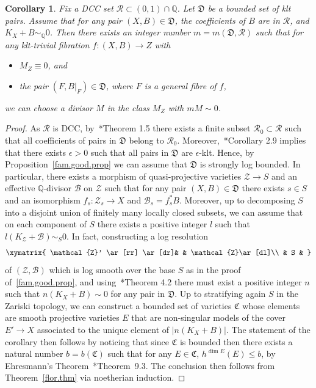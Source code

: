 \documentclass[11pt]{ip-journal}
\newtheorem{corollary}[theorem]{Corollary}
\theoremstyle{definition}
\newcommand{\bQ}{\mathbb{Q}}
\begin{document}
\begin{corollary}
\label{cbf.triv.cor}
Fix a DCC set 
$\mathcal{R} \subset (0, 1) \cap \bQ$. 
Let 
$\mathfrak{D}$ 
be a bounded set of klt pairs.
Assume that for any pair 
$(X, B) \in \mathfrak{D}$, 
the coefficients of 
$B$ 
are in 
$\mathcal{R}$,
and 
$K_X+B \sim_\bQ 0$.
Then there exists an integer number 
$m=m(\mathfrak{D}, \mathcal{R})$ 
such that for any klt-trivial fibration 
$f\colon (X,B)\rightarrow Z$ 
with
\begin{itemize}
\item 
$M_Z\equiv 0$, 
and

\item 
the pair 
$(F, B|_F) \in \mathfrak{D}$, 
where 
$F$ 
is a general fibre of 
$f$,
\end{itemize}
we can choose a divisor 
$M$ 
in the class 
$M_Z$ 
with 
$mM\sim 0$.
\end{corollary}

\begin{proof}
As 
$\mathcal{R}$ 
is DCC, by~\cite{MR3224718}*{Theorem 1.5} there exists a finite subset 
$\mathcal{R}_0 \subset \mathcal{R}$ 
such that all coefficients of pairs in 
$\mathfrak{D}$ 
belong to 
$\mathcal{R}_0$.
Moreover,~\cite{DCS}*{Corollary 2.9} implies that there exists 
$\epsilon >0$ 
such that all pairs in 
$\mathfrak{D}$ 
are 
$\epsilon$-klt.
Hence, by Proposition~\ref{fam.good.prop} we can assume that 
$\mathfrak D$ 
is strongly log bounded. 
In particular, there exists a morphism of quasi-projective varieties 
$\mathcal{Z} \to S$ 
and an effective 
$\mathbb{Q}$-divisor 
$\mathcal{B}$ 
on 
$\mathcal Z$ 
such that for any pair 
$(X, B) \in \mathfrak{D}$ 
there exists 
$s \in S$ 
and an isomorphism 
$f_s \colon \mathcal{Z}_s\to X$ 
and 
$\mathcal{B}_s = f^\ast_s B$.
Moreover, up to decomposing 
$S$ 
into a disjoint union of finitely many locally closed subsets, we can assume that on each component of 
$S$ 
there exists a positive integer 
$l$ 
such that 
$l(K_{\mathcal{Z}} + \mathcal{B}) \sim_{S} 0$. 
In fact, constructing a log resolution 
\[
\xymatrix{
\mathcal{Z}' \ar[rr] \ar[dr]& & \mathcal{Z}\ar[dl]\\
& S &
}
\]
of 
$(\mathcal{Z}, \mathcal{B})$ 
which is log smooth over the base $S$ as in the proof of~\ref{fam.good.prop}, and using~\cite{MR3779687}*{Theorem 4.2} there must exist a positive integer 
$n$ 
such that 
$n(K_X+B) \sim 0$ 
for any pair in 
$\mathfrak{D}$.
Up to stratifying again
$S$ 
in the Zariski topology, we can construct a bounded set of varieties 
$\mathfrak{C}$
whose elements are smooth projective varieties 
$E$ 
that are non-singular models of the cover 
$E' \to X$ 
associated to the unique element of 
$|n(K_X+B)|$. 
The statement of the corollary then follows by noticing that since 
$\mathfrak{C}$
is bounded then there exists a natural number 
$b=b(\mathfrak{C})$ 
such that for any 
$E \in \mathfrak{C}$, $h^{\dim E}(E) \leq b$, by Ehresmann's Theorem~\cite{MR2451566}*{Theorem~9.3}. 
The conclusion then follows from Theorem~\ref{flor.thm} via noetherian induction. 
\end{proof}
\end{document}
